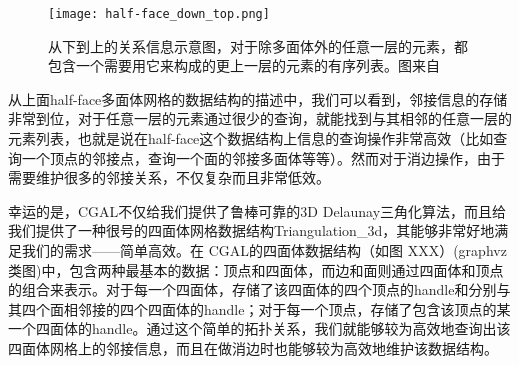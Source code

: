 \begin{figure}[htbp]
    \centering
    \texttt{[image: half-face\_down\_top.png]}
    \caption{从下到上的关系信息示意图，对于除多面体外的任意一层的元素，都包含一个需要用它来构成的更上一层的元素的有序列表。图来自\cite{open-volume-mesh}}
    \label{fig:half-face-down-top}
\end{figure}
从上面half-face多面体网格的数据结构的描述中，我们可以看到，邻接信息的存储非常到位，对于任意一层的元素通过很少的查询，就能找到与其相邻的任意一层的元素列表，也就是说在half-face这个数据结构上信息的查询操作非常高效（比如查询一个顶点的邻接点，查询一个面的邻接多面体等等）。然而对于消边操作，由于需要维护很多的邻接关系，不仅复杂而且非常低效。\par
幸运的是，CGAL不仅给我们提供了鲁棒可靠的3D Delaunay三角化算法，而且给我们提供了一种很号的四面体网格数据结构Triangulation\_3d，其能够非常好地满足我们的需求——简单高效。在 CGAL的四面体数据结构（如图 XXX）(graphvz 类图)中，包含两种最基本的数据：顶点和四面体，而边和面则通过四面体和顶点的组合来表示。对于每一个四面体，存储了该四面体的四个顶点的handle和分别与其四个面相邻接的四个四面体的handle；对于每一个顶点，存储了包含该顶点的某一个四面体的handle。通过这个简单的拓扑关系，我们就能够较为高效地查询出该四面体网格上的邻接信息，而且在做消边时也能够较为高效地维护该数据结构。

